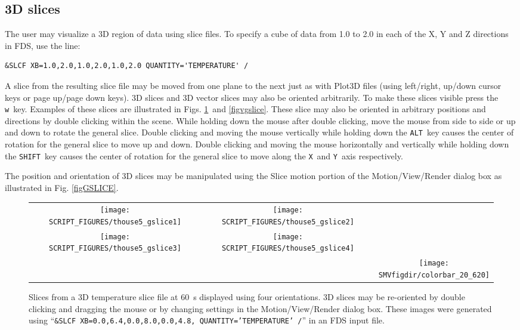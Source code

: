 \documentclass[11pt,twoside]{book}
\newcommand{\figheightAbar}{2.2in}
\begin{document}
\subsection{3D slices}
The user may visualize a 3D region of data using slice files.
To specify a cube of data from 1.0 to 2.0 in each
of the X, Y and Z directions in FDS, use the line:
\begin{lstlisting}
&SLCF XB=1.0,2.0,1.0,2.0,1.0,2.0 QUANTITY='TEMPERATURE' /
\end{lstlisting}

A slice from the resulting slice file
may be moved from one plane to the next just as with Plot3D
files (using left/right, up/down cursor keys or page up/page down
keys).  3D slices and 3D vector slices may also be oriented arbitrarily.
To make these slices visible press the {\tt w}\ key.  Examples of
these slices are illustrated in Figs. \ref{figgslice}\ and \ref{figvgslice}.
These slice may also be oriented in arbitrary positions and directions by
double clicking within the scene.  While holding down the mouse after double clicking,
move the mouse from
side to side or up and down to rotate the general slice.  Double clicking and moving
the mouse vertically while holding down the {\tt ALT}\
key causes the center of rotation for the general slice to move up and down.
Double clicking and moving the mouse horizontally and vertically while holding down
the {\tt SHIFT}\ key causes the center of rotation for the general slice to move along
the {\tt X}\ and {\tt Y}\ axis respectively.

The position and orientation of 3D slices may be manipulated using the Slice motion
portion of the Motion/View/Render dialog box as illustrated
in Fig. \ref{figGSLICE}.

\begin{figure}[bph]
\begin{center}
\begin{tabular}{ccc}
\texttt{[image: SCRIPT\_FIGURES/thouse5\_gslice1]}&
\texttt{[image: SCRIPT\_FIGURES/thouse5\_gslice2]}\\
\texttt{[image: SCRIPT\_FIGURES/thouse5\_gslice3]}&
\texttt{[image: SCRIPT\_FIGURES/thouse5\_gslice4]}&\\
&&\raisebox{0.0ex}[0pt]{\texttt{[image: \\SMVfigdir/colorbar\_20\_620]}}\\
\end{tabular}
\caption [General oriented temperature slices.]
{
Slices from a 3D temperature slice file at 60~s displayed using four orientations.
3D slices may be re-oriented by double clicking and dragging the mouse
or by changing settings in the Motion/View/Render dialog box.
These images were generated using
``{\tt \&SLCF XB=0.0,6.4,0.0,8.0,0.0,4.8, QUANTITY='TEMPERATURE' /}'' in an FDS
input file. }
\label{figgslice}%
\end{center}
\end{figure}
\end{document}
